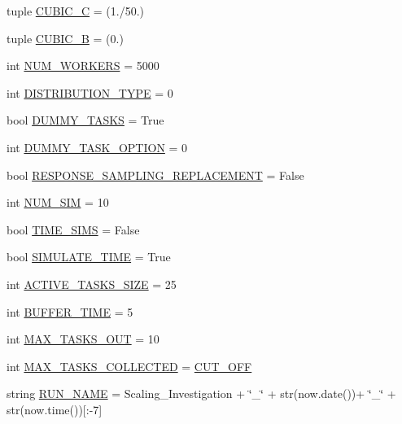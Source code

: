 \begin{DoxyCompactItemize}
tuple \mbox{\hyperlink{namespacereorder_a073a7aa1bc6b8c92d5682922759765fd}{C\+U\+B\+I\+C\+\_\+C}} = (1./50.)
\item 
tuple \mbox{\hyperlink{namespacereorder_a2d4f2e30d34616c754114da7b5c88000}{C\+U\+B\+I\+C\+\_\+B}} = (0.)
\item 
int \mbox{\hyperlink{namespacereorder_a806fc12166c09fa5baabfcbe218040ae}{N\+U\+M\+\_\+\+W\+O\+R\+K\+E\+RS}} = 5000
\item 
int \mbox{\hyperlink{namespacereorder_aceed21fa0675802d2f756c7da43cb049}{D\+I\+S\+T\+R\+I\+B\+U\+T\+I\+O\+N\+\_\+\+T\+Y\+PE}} = 0
\item 
bool \mbox{\hyperlink{namespacereorder_a16edb4f07d82f0494347a0977663e6f4}{D\+U\+M\+M\+Y\+\_\+\+T\+A\+S\+KS}} = True
\item 
int \mbox{\hyperlink{namespacereorder_a0b87eab5c4f4f0b986a43805f825d2c6}{D\+U\+M\+M\+Y\+\_\+\+T\+A\+S\+K\+\_\+\+O\+P\+T\+I\+ON}} = 0
\item 
bool \mbox{\hyperlink{namespacereorder_a1f569cdee80dfd4d7a2d7a3f3aebc47f}{R\+E\+S\+P\+O\+N\+S\+E\+\_\+\+S\+A\+M\+P\+L\+I\+N\+G\+\_\+\+R\+E\+P\+L\+A\+C\+E\+M\+E\+NT}} = False
\item 
int \mbox{\hyperlink{namespacereorder_a3baf5565851cd87736238d8dddfc1106}{N\+U\+M\+\_\+\+S\+IM}} = 10
\item 
bool \mbox{\hyperlink{namespacereorder_a3dd608f63971ae7536ce7be96396c510}{T\+I\+M\+E\+\_\+\+S\+I\+MS}} = False
\item 
bool \mbox{\hyperlink{namespacereorder_af689b6dbf6a3a082bbfb9f6decf1a805}{S\+I\+M\+U\+L\+A\+T\+E\+\_\+\+T\+I\+ME}} = True
\item 
int \mbox{\hyperlink{namespacereorder_a374727dba0574510b39c1e2871f69e48}{A\+C\+T\+I\+V\+E\+\_\+\+T\+A\+S\+K\+S\+\_\+\+S\+I\+ZE}} = 25
\item 
int \mbox{\hyperlink{namespacereorder_a04a9eab148403f1f27d44b38211aad04}{B\+U\+F\+F\+E\+R\+\_\+\+T\+I\+ME}} = 5
\item 
int \mbox{\hyperlink{namespacereorder_a27cea6b210bbcb9af3fbd7edc3901390}{M\+A\+X\+\_\+\+T\+A\+S\+K\+S\+\_\+\+O\+UT}} = 10
\item 
int \mbox{\hyperlink{namespacereorder_aa05c90c0672e9b74717bdeabb00fd1bb}{M\+A\+X\+\_\+\+T\+A\+S\+K\+S\+\_\+\+C\+O\+L\+L\+E\+C\+T\+ED}} = \mbox{\hyperlink{namespacereorder_a914791c176a78c026dc76a18bcd88d73}{C\+U\+T\+\_\+\+O\+FF}}
\item 
string \mbox{\hyperlink{namespacereorder_a1e90a00628c373ad2f7e63b20ba08b9c}{R\+U\+N\+\_\+\+N\+A\+ME}} = \textquotesingle{}Scaling\+\_\+\+Investigation\textquotesingle{} + \char`\"{}\+\_\+\char`\"{} + str(now.\+date())+ \char`\"{}\+\_\+\char`\"{} + str(now.\+time())\mbox{[}\+:-\/7\mbox{]}

\end{DoxyCompactItemize}
